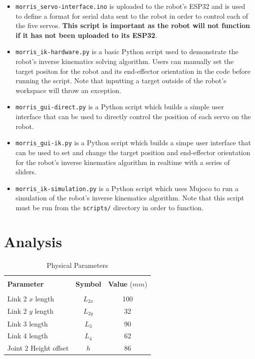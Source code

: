 \documentclass[a4paper,11pt]{article}
\begin{document}
\begin{itemize}
    \item \texttt{morris\_servo-interface.ino} is uploaded to the robot's ESP32 and is used to define a format for serial data sent to the robot in order to control each of the five servos. \textbf{This script is important as the robot will not function if it has not been uploaded to its ESP32}.
    \item \texttt{morris\_ik-hardware.py} is a basic Python script used to demonstrate the robot's inverse kinematics solving algorithm. Users can manually set the target positon for the robot and its end-effector orientation in the code before running the script. Note that inputting a target outside of the robot's workspace will throw an exception.
    \item \texttt{morris\_gui-direct.py} is a Python script which builds a simple user interface that can be used to directly control the position of each servo on the robot.
    \item \texttt{morris\_gui-ik.py} is a Python script which builds a simpe user interface that can be used to set and change the target position and end-effector orientation for the robot's inverse kinematics algorithm in realtime with a series of sliders.
    \item \texttt{morris\_ik-simulation.py} is a Python script which uses Mujoco to run a simulation of the robot's inverse kinematics algorithm. Note that this script must be run from the \texttt{scripts/} directory in order to function.
\end{itemize}


\newpage
\section{Analysis}
\begin{table}
    \centering
    \caption{Physical Parameters}
    \label{tab:physicals}
    \begin{tabular}{p{4cm} c c}
        \hline \\
        \textbf{Parameter}    & \textbf{Symbol} & \textbf{Value} ($\si{mm}$) \\
        \hline \\
        Link 2 $x$ length     & $L_{2x}$        & 100 \\
        Link 2 $y$ length     & $L_{2y}$        & 32  \\
        Link 3 length         & $L_{3}$         & 90  \\
        Link 4 length         & $L_{4}$         & 62  \\
        Joint 2 Height offset & $h$             & 86  \\
        \hline
    \end{tabular}
\end{table}
\end{document}
